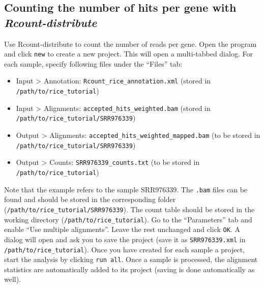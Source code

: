 \documentclass[a4paper,10pt]{article}
\begin{document}
\subsection{Counting the number of hits per gene with \textit{Rcount-distribute}}
Use Rcount-distribute to count the number of reads per gene. Open the program and click \texttt{new} to create a new project. This will open a multi-tabbed dialog. For each sample, specify following files under the ``Files'' tab:
\begin{itemize}
\item Input {\textgreater} Annotation: \texttt{Rcount\_rice\_annotation.xml} \newline (stored in \texttt{/path/to/rice\_tutorial})
\item Input {\textgreater} Alignments: \texttt{accepted\_hits\_weighted.bam} \newline (stored in \texttt{/path/to/rice\_tutorial/SRR976339})
\item Output {\textgreater} Alignments: \texttt{accepted\_hits\_weighted\_mapped.bam} \newline (to be stored in \texttt{/path/to/rice\_tutorial/SRR976339})
\item Output {\textgreater} Counts: \texttt{SRR976339\_counts.txt} \newline (to be stored in \texttt{/path/to/rice\_tutorial})
\end{itemize}
Note that the example refers to the sample SRR976339. The \texttt{.bam} files can be found and should be stored in the corresponding folder (\texttt{/path/to/rice\_tutorial/SRR976339}). The count table should be stored in the working directory (\texttt{/path/to/rice\_tutorial}). Go to the ``Parameters'' tab and enable ``Use multiple alignments''. Leave the rest unchanged and click \texttt{OK}. A dialog will open and ask you to save the project (save it as \texttt{SRR976339.xml} in \texttt{/path/to/rice\_tutorial}). Once you have created for each sample a project, start the analysis by clicking \texttt{run all}. Once a sample is processed, the alignment statistics are automatically added to its project (saving is done automatically as well). 
\end{document}
